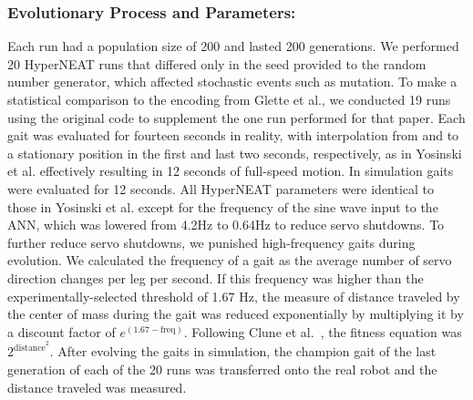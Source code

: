 
\subsubsection{Evolutionary Process and Parameters:}

Each run had a population size of 200 and lasted 200 generations. We performed 20 HyperNEAT runs that differed only in the seed provided to the random number generator, which affected stochastic events such as mutation. To make a statistical comparison to the encoding from Glette et al., we conducted 19 runs using the original code to supplement the one run performed for that paper. 
Each gait was evaluated for fourteen seconds in reality, with interpolation from and to a stationary position in the first and last two seconds, respectively, as in Yosinski et al. effectively resulting in 12 seconds of full-speed
motion. In simulation gaits were evaluated for 12 seconds. 
All HyperNEAT parameters were identical to those in Yosinski et al. except for the frequency of the sine wave input to the ANN, which was lowered from 4.2Hz to 0.64Hz to reduce servo shutdowns. 
To further reduce servo shutdowns, we punished high-frequency gaits during evolution. We calculated the frequency of a gait as the average number of servo direction changes per leg per second. If this frequency was higher than the experimentally-selected threshold of 1.67 Hz, the measure of distance traveled by the center of mass during the gait was reduced exponentially by multiplying it by a discount factor of $e^{(1.67-\mathrm{freq})}$. Following Clune et al.~\cite{clune2009evolving}, the fitness equation was $2^{\mathrm{distance}^{2}}$. After evolving the gaits in simulation, the champion gait of the last generation of each of the 20 runs was transferred onto the real robot and the distance traveled was measured. 

